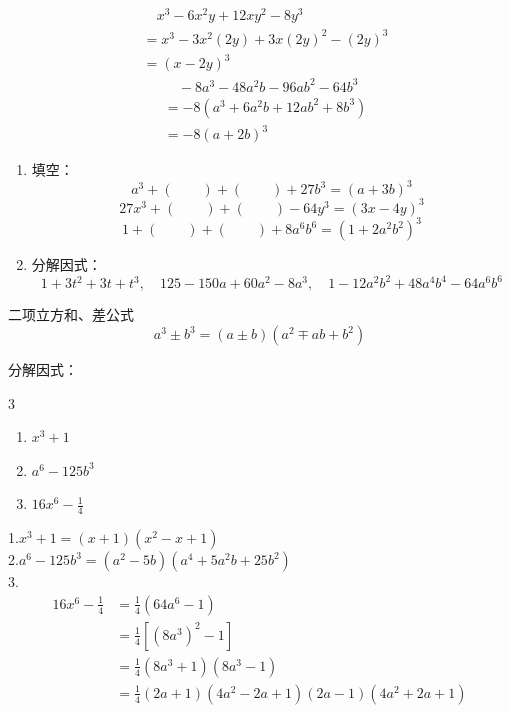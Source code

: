 \begin{solution}
\[\begin{split}
      &\quad       x^3-6x^2y+12xy^2-8y^3\\
      &=x^3-3x^2(2y)+3x(2y)^2-(2y)^3\\
      &=(x-2y)^3
        \end{split}\]
 \[\begin{split}
            &\quad -8a^3-48a^2b-96ab^2-64b^3\\
&=-8(a^3+6a^2b+12ab^2+8b^3)\\
&=-8(a+2b)^3
        \end{split}\]
  
\end{solution}

\begin{ex}
\begin{enumerate}
    \item 填空：
    \[a^3+(\quad \quad)+(\quad\quad )+27b^3=(a+3b)^3\]
    \[27x^3+(\quad\quad)+(\quad\quad )-64y^3=(3x-4y)^3\]
    \[1+(\quad\quad)+(\quad\quad)+8a^6b^6=(1+2a^2b^2)^3\]

\item 分解因式：
\[1+3t^2+3t+t^3,\quad 125-150a+60a^2-8a^3,\quad 1-12a^2b^2+48a^4b^4-64a^6b^6\]
\end{enumerate}    
\end{ex}

\begin{blk}{二项立方和、差公式}
    \[a^3\pm b^3 =(a\pm b)(a^2\mp ab+b^2)\]
\end{blk}

\begin{example}
分解因式：
\begin{multicols}{3}
    \begin{enumerate}
        \item $x^3+1$
        \item $a^6-125b^3$
        \item $16x^6-\frac{1}{4}$
    \end{enumerate}
\end{multicols}
\end{example}

\begin{solution}
1.\quad$x^3+1=(x+1)(x^2-x+1)$\\
2.\quad$a^6-125b^3=(a^2-5b)(a^4+5a^2b+25b^2)$\\
3.\[\begin{split}
    16x^6-\frac{1}{4}&=\frac{1}{4}(64a^6-1)\\
    &=\frac{1}{4}\left[(8a^3)^2-1\right]\\
    &=\frac{1}{4}(8a^3+1)(8a^3-1)\\
    &=\frac{1}{4}(2a+1)(4a^2-2a+1)(2a-1)(4a^2+2a+1)
\end{split}\]
\end{solution}

